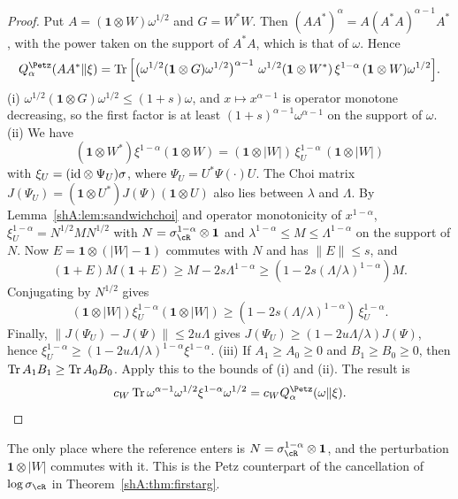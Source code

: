 \begin{proof}
Put $A=(\mathbf 1\otimes W)\omega^{1/2}$ and $G=W^*W$. Then $(AA^*)^\alpha=A(A^*A)^{\alpha-1}A^*$, with the power taken on the support of $A^*A$, which is that of $\omega$. Hence
\[
Q^\Petz_\alpha(AA^*\|\xi)=\Tr\Big[\big(\omega^{1/2}(\mathbf 1\otimes G)\omega^{1/2}\big)^{\alpha-1}\ \omega^{1/2}(\mathbf 1\otimes W^*)\,\xi^{1-\alpha}\,(\mathbf 1\otimes W)\omega^{1/2}\Big].
\]
(i) $\omega^{1/2}(\mathbf 1\otimes G)\omega^{1/2}\le(1+s)\omega$, and $x\mapsto x^{\alpha-1}$ is operator monotone decreasing, so the first factor is at least $(1+s)^{\alpha-1}\omega^{\alpha-1}$ on the support of $\omega$.
(ii) We have
\[
(\mathbf 1\otimes W^*)\xi^{1-\alpha}(\mathbf 1\otimes W)=(\mathbf 1\otimes|W|)\,\xi_U^{1-\alpha}\,(\mathbf 1\otimes|W|)
\]
with $\xi_U=(\mathrm{id}\otimes\Psi_U)\sigma$, where $\Psi_U=U^*\Psi(\cdot)U$. The Choi matrix $J(\Psi_U)=(\mathbf 1\otimes U^*)J(\Psi)(\mathbf 1\otimes U)$ also lies between $\lambda$ and $\Lambda$. By Lemma~\ref{shA:lem:sandwichchoi} and operator monotonicity of $x^{1-\alpha}$, $\xi_U^{1-\alpha}=N^{1/2}MN^{1/2}$ with $N=\sigma_\cR^{1-\alpha}\otimes\mathbf 1$ and $\lambda^{1-\alpha}\le M\le\Lambda^{1-\alpha}$ on the support of $N$. Now $E=\mathbf 1\otimes(|W|-\mathbf 1)$ commutes with $N$ and has $\|E\|\le s$, and
\[
(\mathbf 1+E)M(\mathbf 1+E)\ge M-2s\Lambda^{1-\alpha}\ge(1-2s(\Lambda/\lambda)^{1-\alpha})M.
\]
Conjugating by $N^{1/2}$ gives
\[
(\mathbf 1\otimes|W|)\xi_U^{1-\alpha}(\mathbf 1\otimes|W|)\ge(1-2s(\Lambda/\lambda)^{1-\alpha})\,\xi_U^{1-\alpha}.
\]
Finally, $\|J(\Psi_U)-J(\Psi)\|\le2u\Lambda$ gives $J(\Psi_U)\ge(1-2u\Lambda/\lambda)J(\Psi)$, hence $\xi_U^{1-\alpha}\ge(1-2u\Lambda/\lambda)^{1-\alpha}\xi^{1-\alpha}$.
(iii) If $A_1\ge A_0\ge0$ and $B_1\ge B_0\ge0$, then $\operatorname{Tr} A_1B_1\ge\operatorname{Tr} A_0B_0$. Apply this to the bounds of (i) and (ii). The result is
\[
c_W\Tr\omega^{\alpha-1}\omega^{1/2}\xi^{1-\alpha}\omega^{1/2}=c_WQ^\Petz_\alpha(\omega\|\xi).
\]
\end{proof}

The only place where the reference enters is $N=\sigma_\cR^{1-\alpha}\otimes\mathbf 1$, and the perturbation $\mathbf 1\otimes|W|$ commutes with it. This is the Petz counterpart of the cancellation of $\log\sigma_\cR$ in Theorem~\ref{shA:thm:firstarg}.

